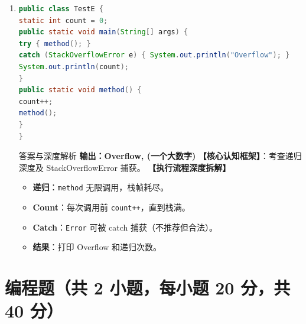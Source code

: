 ﻿\documentclass[12pt, a4paper]{ctexart}
\newcommand{\code}[1]{\texttt{#1}}
\begin{document}
\begin{enumerate}[label=\textbf{\arabic*.}, itemsep=1em]
	\item
	      \begin{lstlisting}[language=Java]
public class TestE {
static int count = 0;
public static void main(String[] args) {
try { method(); } 
catch (StackOverflowError e) { System.out.println("Overflow"); }
System.out.println(count);
}
public static void method() {
count++;
method();
}
}
\end{lstlisting}
	      \begin{bluebox}{答案与深度解析}
		      \textbf{输出：Overflow, (一个大数字)}
		      \textbf{【核心认知框架】}：考查递归深度及 StackOverflowError 捕获。
		      \textbf{【执行流程深度拆解】}
		      \begin{itemize}[leftmargin=*, nosep]
			      \item \textbf{递归}：\code{method} 无限调用，栈帧耗尽。
			      \item \textbf{Count}：每次调用前 \code{count++}，直到栈满。
			      \item \textbf{Catch}：\code{Error} 可被 catch 捕获（不推荐但合法）。
			      \item \textbf{结果}：打印 Overflow 和递归次数。
		      \end{itemize}
	      \end{bluebox}
\end{enumerate}

\section{编程题（共 2 小题，每小题 20 分，共 40 分）}
\end{document}
